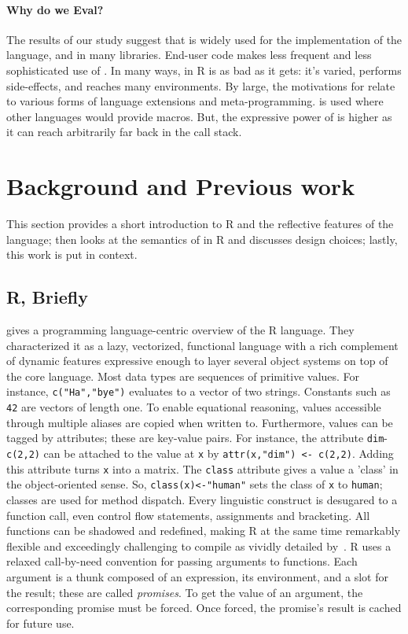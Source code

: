 \documentclass[review,screen,acmsmall]{acmart}%
\renewcommand{\k}[1]{\lstinline |#1|\xspace}
\begin{document}
\paragraph{Why do we Eval?} The results of our study suggest
that \eval is widely used for the implementation of the language, and in many
libraries. End-user code makes less frequent and less sophisticated use of
\eval. In many ways, \eval in R is as bad as it gets: it's varied, performs
side-effects, and reaches many environments. By large, the motivations for
\eval relate to various forms of language extensions and meta-programming. \Eval
is used where other languages would provide macros. But, the expressive power of
\eval is higher as it can reach arbitrarily far back in the call stack.


\section{Background and Previous work}

This section provides a short introduction to R and the reflective features of
the language; then looks at the semantics of \eval in R and discusses design
choices; lastly, this work is put in context.

\subsection{R, Briefly}

\citet{ecoop12} gives a programming language-centric overview of the R language.
They characterized it as a lazy, vectorized, functional language with a rich
complement of dynamic features expressive enough to layer several object systems
on top of the core language. Most data types are sequences of primitive values.
For instance, \k{c("Ha","bye")} evaluates to a vector of two strings. Constants
such as \k{42} are vectors of length one. To enable equational reasoning, values
accessible through multiple aliases are copied when written to. Furthermore,
values can be tagged by attributes; these are key-value pairs. For instance, the
attribute \k{dim}-\k{c(2,2)} can be attached to the value at \k{x} by
\k{attr(x,"dim") <- c(2,2)}. Adding this attribute turns \k{x} into a
matrix. The \k{class} attribute gives a value a 'class' in the object-oriented
sense. So, \k{class(x)<-"human"} sets the class of \k{x} to \k{human}; classes
are used for method dispatch. Every linguistic construct is desugared to a
function call, even control flow statements, assignments and bracketing. All
functions can be shadowed and redefined, making R at the same time remarkably
flexible and exceedingly challenging to compile as vividly detailed
by~\citet{dls19}. R uses a relaxed call-by-need convention for passing arguments
to functions. Each argument is a thunk composed of an expression, its
environment, and a slot for the result; these are called \emph{promises}. To get
the value of an argument, the corresponding promise must be forced. Once forced,
the promise's result is cached for future use.
\end{document}
